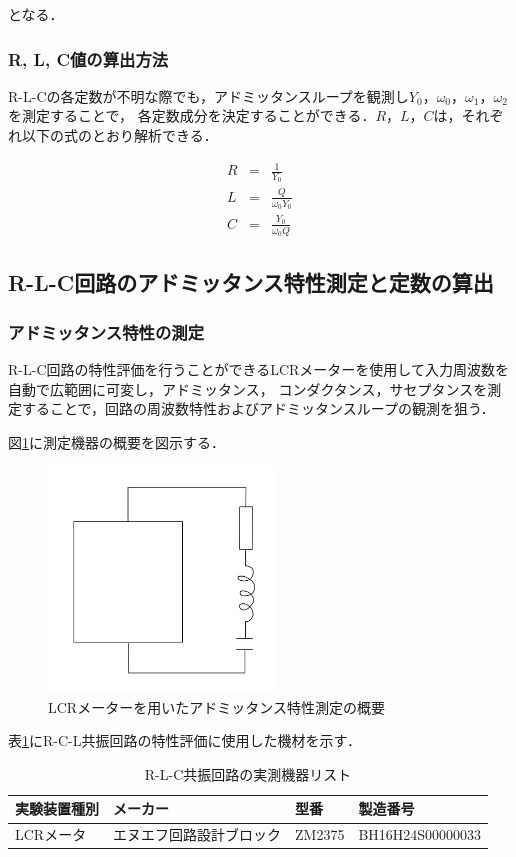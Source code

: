 \documentclass[dvipdfmx,titlepage,a4j]{jsarticle}  %
\numberwithin{equation}{section}
\begin{document}
となる．

\subsubsection{R, L, C値の算出方法}
R-L-Cの各定数が不明な際でも，アドミッタンスループを観測し$Y_0$，$\omega_0$，$\omega_1$，$\omega_2$を測定することで，
各定数成分を決定することができる．$R$，$L$，$C$は，それぞれ以下の式のとおり解析できる．

\begin{eqnarray}
  R &=& \frac{1}{Y_0} \\
  L &=& \frac{Q}{\omega_0 Y_0} \\
  C &=& \frac{Y_0}{\omega_0 Q}
\end{eqnarray}

\subsection{R-L-C回路のアドミッタンス特性測定と定数の算出}

\subsubsection{アドミッタンス特性の測定}
R-L-C回路の特性評価を行うことができるLCRメーターを使用して入力周波数を自動で広範囲に可変し，アドミッタンス，
コンダクタンス，サセプタンスを測定することで，回路の周波数特性およびアドミッタンスループの観測を狙う．

図\ref{fig:fig7-meter.jpg}に測定機器の概要を図示する．
\begin{figure}[H]
  \centering
  \includegraphics[width=6cm]{../fig/fig7-meter.jpg}
  \caption{LCRメーターを用いたアドミッタンス特性測定の概要}
  \label{fig:fig7-meter.jpg}
\end{figure}

表\ref{tbl:r-l-c-list}にR-C-L共振回路の特性評価に使用した機材を示す．

\begin{table}[htbp]
  \caption{R-L-C共振回路の実測機器リスト}
  \begin{center}
    \begin{tabular}{l|l|l|l}
      \hline
      実験装置種別 & メーカー                 & 型番   & 製造番号         \\ \hline \hline
      LCRメータ    & エヌエフ回路設計ブロック & ZM2375 & BH16H24S00000033 \\ \hline
    \end{tabular}
  \end{center}
  \label{tbl:r-l-c-list}
\end{table}
\end{document}
